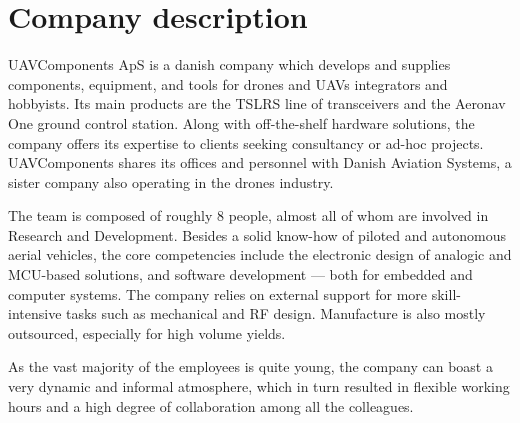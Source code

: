 \section{Company description}

UAVComponents ApS is a danish company which develops and supplies components, equipment, and tools for drones and UAVs integrators and hobbyists.
Its main products are the TSLRS line of transceivers and the Aeronav One ground control station.
Along with off-the-shelf hardware solutions, the company offers its expertise to clients seeking consultancy or ad-hoc projects.
UAVComponents shares its offices and personnel with Danish Aviation Systems, a sister company also operating in the drones industry.

The team is composed of roughly 8 people, almost all of whom are involved in Research and Development.
Besides a solid know-how of piloted and autonomous aerial vehicles, the core competencies include the electronic design of analogic and MCU-based solutions, and software development --- both for embedded and computer systems.
The company relies on external support for more skill-intensive tasks such as mechanical and RF design.
Manufacture is also mostly outsourced, especially for high volume yields.

As the vast majority of the employees is quite young, the company can boast a very dynamic and informal atmosphere, which in turn resulted in flexible working hours and a high degree of collaboration among all the colleagues.

